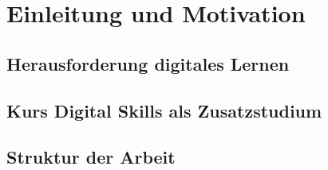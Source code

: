 \section{Einleitung und Motivation}\label{einleitung}
\subsection{Herausforderung digitales Lernen}


\subsection{Kurs Digital Skills als Zusatzstudium}
\subsection{Struktur der Arbeit}